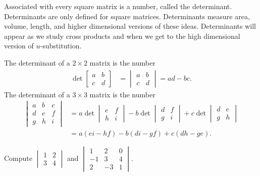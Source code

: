 Associated with every square matrix is a number, called the determinant.  Determinants are only defined for square matrices.
Determinants measure area, volume, length, and higher dimensional versions of these ideas.  Determinants will appear as we study cross products and when we get to the high dimensional version of {$u$}-substitution.
\begin{definition}
The determinant of a {$2\times 2$} matrix is the number 
\begin{align*}
\det\begin{bmatrix}a&b\\c&d\end{bmatrix} &=\begin{vmatrix}a&b\\c&d\end{vmatrix} = ad-bc.
\end{align*}
The determinant of a {$3\times 3$} matrix is the number 
\begin{align*}
\begin{vmatrix}a&b&c\\d&e&f\\g&h&i\end{vmatrix} &= a\det\begin{vmatrix}e&f\\h&i\end{vmatrix} -b\det\begin{vmatrix}d&f\\g&i\end{vmatrix} +c\det\begin{vmatrix}d&e\\g&h\end{vmatrix}\\
&=a(ei-hf)-b(di-gf)+c(dh-ge).
\end{align*}
\end{definition}

\begin{problem}
Compute 
$\begin{vmatrix}
1&2\\
3&4
\end{vmatrix} 
$
and 
$\begin{vmatrix}
1&2&0\\
-1&3&4\\
2&-3&1
\end{vmatrix} 
$.
\end{problem}

